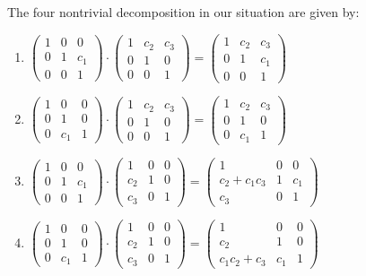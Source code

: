 The four nontrivial decomposition in our situation are given by:
\begin{enumerate}
  \item $\begin{pmatrix} 1 & 0 & 0 \\0 & 1 & c_1 \\0 & 0 & 1 \end{pmatrix}
  \cdot\begin{pmatrix} 1 & c_2 & c_3 \\0 & 1 & 0 \\0 & 0 & 1 \end{pmatrix}=
  \begin{pmatrix} 1 & c_2 & c_3 \\0 & 1 & c_1 \\0 & 0 & 1 \end{pmatrix}$
  \item $\begin{pmatrix} 1 & 0 & 0 \\0 & 1 & 0 \\0 & c_1 & 1 \end{pmatrix}
  \cdot\begin{pmatrix} 1 & c_2 & c_3 \\0 & 1 & 0 \\0 & 0 & 1 \end{pmatrix}=
  \begin{pmatrix} 1 & c_2 & c_3 \\0 & 1 & 0 \\0 & c_1 & 1 \end{pmatrix}$
  \item $\begin{pmatrix} 1 & 0 & 0 \\0 & 1 & c_1 \\0 & 0 & 1 \end{pmatrix}
  \cdot\begin{pmatrix} 1 & 0 & 0 \\c_2 & 1 & 0 \\c_3 & 0 & 1 \end{pmatrix}=
  \begin{pmatrix} 1 & 0 & 0 \\c_2+c_1c_3 & 1 & c_1 \\c_3 & 0 & 1 \end{pmatrix}$
  \item $\begin{pmatrix} 1 & 0 & 0 \\0 & 1 & 0 \\0 & c_1 & 1 \end{pmatrix}
  \cdot\begin{pmatrix} 1 & 0 & 0 \\c_2 & 1 & 0 \\c_3 & 0 & 1 \end{pmatrix}=
  \begin{pmatrix} 1 & 0 & 0 \\c_2 & 1 & 0 \\c_1c_2+c_3 & c_1 & 1 \end{pmatrix}$
\end{enumerate}

